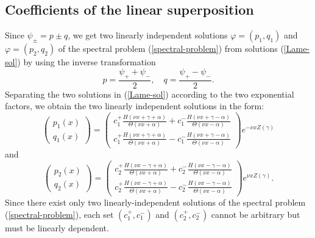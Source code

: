 \documentclass[12pt,reqno]{amsart}
\numberwithin{equation}{section}
\begin{document}
\subsection{Coefficients of the linear superposition}
\label{sec-2-3}

Since $\psi_{\pm} = p \pm q$, we get two linearly independent 
solutions $\varphi = (p_1,q_1)$ and $\varphi = (p_2,q_2)$ of the spectral problem 
(\ref{spectral-problem}) from solutions (\ref{Lame-sol}) by using the inverse transformation 
	$$
	p = \frac{\psi_+ + \psi_-}{2}, \quad q = \frac{\psi_+ - \psi_-}{2}.
	$$
Separating the two solutions in (\ref{Lame-sol}) according to the two exponential factors, we obtain the two linearly independent solutions in the form:
\begin{equation}
\label{Lame-sol-1}
\left( \begin{matrix} p_1(x) \\ q_1(x) \end{matrix} \right) = 
\left( \begin{matrix} 
c_1^+ \frac{ H(\nu x + \gamma + \alpha)}{\Theta(\nu x + \alpha)} + c_1^- \frac{H(\nu x + \gamma - \alpha)}{\Theta(\nu x - \alpha)} \\
c_1^+ \frac{ H(\nu x + \gamma + \alpha)}{\Theta(\nu x + \alpha)} - c_1^- \frac{H(\nu x + \gamma - \alpha)}{\Theta(\nu x - \alpha)} \end{matrix} 
\right)  e^{-\nu x Z(\gamma)}
\end{equation}
and 
\begin{equation}
\label{Lame-sol-2}
\left( \begin{matrix} p_2(x) \\ q_2(x) \end{matrix} \right) = 
\left( \begin{matrix} c_2^+ \frac{ H(\nu x - \gamma + \alpha)}{\Theta(\nu x + \alpha)} + c_2^- \frac{H(\nu x - \gamma - \alpha)}{\Theta(\nu x - \alpha)} \\
c_2^+ \frac{ H(\nu x - \gamma + \alpha)}{\Theta(\nu x + \alpha)} - c_2^- \frac{H(\nu x - \gamma - \alpha)}{\Theta(\nu x - \alpha)}  \end{matrix} \right) 
e^{\nu x Z(\gamma)}. 
\end{equation}
Since there exist only two linearly-independent solutions of the spectral problem (\ref{spectral-problem}), each set $(c_1^+,c_1^-)$ and $(c_2^+,c_2^-)$ cannot be arbitrary but must be linearly dependent.
\end{document}
